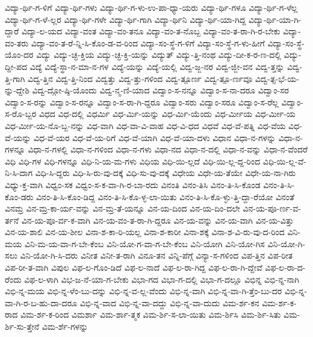 {ವಿದ್ಯಾ-ರ್ಥಿ-ಗ-ಳಿಗೆ
ವಿದ್ಯಾ-ರ್ಥಿ-ಗಳು
ವಿದ್ಯಾ-ರ್ಥಿ-ಗ-ಳು-ಉ-ಪಾ-ಧ್ಯಾ-ಯರು
ವಿದ್ಯಾ-ರ್ಥಿ-ಗಳೂ
ವಿದ್ಯಾ-ರ್ಥಿ-ಗ-ಳೆಲ್ಲ
ವಿದ್ಯಾ-ರ್ಥಿ-ಗ-ಳೆ-ಲ್ಲರ
ವಿದ್ಯಾ-ರ್ಥಿ-ಗಳೇ
ವಿದ್ಯಾ-ರ್ಥಿ-ಗಾಗಿ
ವಿದ್ಯಾ-ರ್ಥಿನಿ
ವಿದ್ಯಾ-ರ್ಥಿ-ಯಾ-ಗಿದ್ದ
ವಿದ್ಯಾ-ರ್ಥಿ-ಯಾ-ಗಿ-ದ್ದಾರೆ
ವಿದ್ಯಾ-ಲ-ಯದ
ವಿದ್ಯಾ-ವಂತ
ವಿದ್ಯಾ-ವಂ-ತನೂ
ವಿದ್ಯಾ-ವಂ-ತ-ನೊಬ್ಬ
ವಿದ್ಯಾ-ವಂ-ತ-ರಾ-ಗಿ-ರ-ಬೇಕು
ವಿದ್ಯಾ-ವಂ-ತರು
ವಿದ್ಯಾ-ವಂ-ತ-ರೆ-ನ್ನಿ-ಸಿ-ಕೊಂ-ಡ-ವ-ರಿಂದ
ವಿದ್ಯಾ-ಸಂ-ಸ್ಥೆ-ಗ-ಳಿಗೆ
ವಿದ್ಯಾ-ಸಂ-ಸ್ಥೆ-ಗ-ಳು-ಹೀಗೆ
ವಿದ್ಯಾ-ಸಂ-ಸ್ಥೆ-ಯೊಂ-ದರ
ವಿದ್ಯು
ವಿದ್ಯು-ಚ್ಛ-ಕ್ತಿಯ
ವಿದ್ಯು-ಚ್ಛ-ಕ್ತಿ-ಯನ್ನು
ವಿದ್ಯುತ್
ವಿದ್ಯು-ತ್ತಿ-ನಂಥ
ವಿದ್ಯು-ದೀ-ಕ-ರ-ಣ-ದಲ್ಲಿ
ವಿದ್ಯು-ದ್ದೀ-ಪದ
ವಿದ್ಯೆ
ವಿದ್ಯೆ-ಸ್ಥಾ-ನ-ಮಾ-ನ-ಗಳ
ವಿದ್ಯೆ-ಯನ್ನು
ವಿದ್ಯೆ-ಯಲ್ಲಿ
ವಿದ್ವ-ಜ್ಜ-ನರ
ವಿದ್ವ-ಜ್ಜೀ-ವನ
ವಿದ್ವ-ತ್ತನ್ನು
ವಿದ್ವ-ತ್ತಿ-ಗಾಗಿ
ವಿದ್ವ-ತ್ತಿನ
ವಿದ್ವ-ತ್ತಿ-ನಿಂದ
ವಿದ್ವತ್ತು
ವಿದ್ವ-ತ್ತು-ಗಳಿಂದ
ವಿದ್ವ-ತ್ಪೂರ್ಣ
ವಿದ್ವ-ತ್ಪೂ-ರ್ಣವೂ
ವಿದ್ವ-ತ್ಸ-ಭೆ-ಯ-ನ್ನು-ದ್ದೇಶಿ
ವಿದ್ವ-ದ್ಗೋ-ಷ್ಠಿ-ಯೊಂದು
ವಿದ್ವ-ನ್ಮ-ಣಿ-ಯಾದ
ವಿದ್ವಾಂ-ಸ-ನನ್ನೂ
ವಿದ್ವಾಂ-ಸ-ನಾ-ದರೂ
ವಿದ್ವಾಂ-ಸರ
ವಿದ್ವಾಂ-ಸ-ರನ್ನು
ವಿದ್ವಾಂ-ಸ-ರನ್ನೂ
ವಿದ್ವಾಂ-ಸ-ರಾ-ಗಿ-ದ್ದರೂ
ವಿದ್ವಾಂ-ಸರು
ವಿದ್ವಾಂ-ಸರೂ
ವಿದ್ವಾಂ-ಸ-ರೆಲ್ಲ
ವಿದ್ವಾಂ-ಸ-ರೊ-ಬ್ಬರ
ವಿಧದ
ವಿಧ-ದಲ್ಲಿ
ವಿಧರ್ಮಿ
ವಿಧ-ರ್ಮಿ-ಯನ್ನು
ವಿಧ-ರ್ಮಿ-ಯೆಂದು
ವಿಧ-ರ್ಮೀಯ
ವಿಧ-ರ್ಮೀ-ಯ
ವಿಧ-ರ್ಮೀ-ಯ-ನೊ-ಬ್ಬ-ನನ್ನು
ವಿಧ-ವಾಗಿ
ವಿಧ-ವಾ-ವಿ-ವಾಹ
ವಿಧ-ವಿ-ಧದ
ವಿಧವೆ
ವಿಧ-ವೆ-ಪತ್ನಿ
ವಿಧ-ವೆಯ
ವಿಧ-ವೆ-ಯನ್ನು
ವಿಧ-ವೆ-ಯರ
ವಿಧ-ವೆ-ಯ-ರಿಗೆ
ವಿಧ-ವೆ-ಯಾಗಿ
ವಿಧ-ವೆ-ಯಾ-ದಳು
ವಿಧಾನ
ವಿಧಾ-ನ-ಗಳನ್ನು
ವಿಧಾ-ನ-ಗಳನ್ನೂ
ವಿಧಾ-ನ-ಗಳಲ್ಲಿ
ವಿಧಾ-ನ-ಗಳಿಂದ
ವಿಧಾ-ನ-ಗಳು
ವಿಧಾ-ನದ
ವಿಧಾ-ನ-ದಲ್ಲಿ
ವಿಧಾ-ನ-ವನ್ನು
ವಿಧಾ-ನ-ವೆಂದರೆ
ವಿಧಿ
ವಿಧಿ-ಗಳ
ವಿಧಿ-ಗಳನ್ನೂ
ವಿಧಿ-ನಿ-ಯ-ಮ-ಗಳು
ವಿಧಿಯ
ವಿಧಿ-ಯಿ-ಲ್ಲದೆ
ವಿಧಿ-ಯಿ-ಲ್ಲ-ದ್ದ-ರಿಂದ
ವಿಧಿ-ಯಿ-ಲ್ಲ-ವೆ-ನಿ-ಸಿ-ದಾಗ
ವಿಧಿ-ಸಿ-ದ್ದರು
ವಿಧಿ-ಸಿ-ರು-ವು-ದಕ್ಕೆ
ವಿಧಿ-ಸು-ವು-ದಕ್ಕೆ
ವಿಧೇಯ
ವಿಧೇ-ಯ-ತೆಯೇ
ವಿಧೇ-ಯ-ನಾ-ಗಿರು
ವಿಧ್ಯು-ಕ್ತ-ವಾಗಿ
ವಿಧ್ವಂ-ಸಕ
ವಿಧ್ವಂ-ಸ-ಕ-ವಾ-ಗಿ-ರ-ಬಾ-ರದು
ವಿನಂತಿ
ವಿನಂ-ತಿಸಿ
ವಿನಂ-ತಿ-ಸಿ-ಕೊಂಡ
ವಿನಂ-ತಿ-ಸಿ-ಕೊಂ-ಡರು
ವಿನಂ-ತಿ-ಸಿ-ಕೊಂ-ಡಿದ್ದ
ವಿನಂ-ತಿ-ಸಿ-ಕೊ-ಳ್ಳ-ಲಾ-ಯಿತು
ವಿನಂ-ತಿ-ಸಿ-ಕೊ-ಳ್ಳು-ತ್ತಿ-ದ್ದಾ-ರೆಯೋ
ವಿನಂತೆ
ವಿನಮ್ರ
ವಿನ-ಮ್ರ-ಕಾ-ರ್ಯ-ವನ್ನು
ವಿನ-ಮ್ರ-ತೆ-ಯನ್ನೂ
ವಿನ-ಯ-ದಿಂದ
ವಿನ-ಯ-ದಿಂ-ದಲೇ
ವಿನ-ಯ-ಪೂ-ರ್ಣ-ವ-ರ್ತನೆ
ವಿನ-ಯ-ಪೂ-ರ್ವ-ಕ-ವಾಗಿ
ವಿನ-ಯ-ವಂ-ತ-ರಾ-ಗಿ-ದ್ದರೂ
ವಿನ-ಯ-ವನ್ನು
ವಿನ-ಯ-ವಾಗಿ
ವಿನ-ಯ-ವಿತ್ತು
ವಿನ-ಯ-ಶಾಲಿ
ವಿನ-ಯ-ಶೀಲ
ವಿನಾ-ಶ-ಕಾ-ರಿ-ಯಲ್ಲ
ವಿನಾ-ಶ-ಕಾರೀ
ವಿನಾ-ಶಕ್ಕೆ
ವಿನಾ-ಶ-ವಿ-ರು-ವು-ದ-ರಿಂದ
ವಿನಿ-ಮಯ
ವಿನಿ-ಮ-ಯ-ವಾ-ಗ-ಬೇ-ಕೆಂಬ
ವಿನಿ-ಯೋ-ಗ-ವಾ-ಗ-ಬೇ-ಕೆಂಬ
ವಿನಿ-ಯೋಗಿ
ವಿನಿ-ಯೋ-ಗಿಸ
ವಿನಿ-ಯೋ-ಗಿ-ಸಲು
ವಿನಿ-ಯೋ-ಗಿ-ಸಿ-ದರು
ವಿನೀತ
ವಿನೀ-ತ-ರಾಗಿ
ವಿನೂ-ತನ
ವಿನ್ನಿ-ಪೆಗ್ಗೆ
ವಿನ್ಯಾ-ಸ-ಗಳಿಂದ
ವಿಪ-ತ್ತಿನ
ವಿಪ-ರೀತ
ವಿಪ-ರೀ-ತ-ವಾಗಿ
ವಿಪುಲ
ವಿಫ-ಲ-ಗೊಂ-ಡಿದೆ
ವಿಫ-ಲ-ನಾದೆ
ವಿಫ-ಲ-ರಾ-ಗಿದ್ದ
ವಿಫ-ಲ-ರಾ-ಗಿ-ದ್ದೇವೆ
ವಿಫ-ಲ-ರಾ-ದ-ರೆಂದು
ವಿಫ-ಲ-ಳಾಗಿ
ವಿಭ-ಜ-ನೆ-ಯಾ-ಗ-ಬೇಕು
ವಿಭಾ-ಗದ
ವಿಭಾ-ಗ-ದಲ್ಲಿ
ವಿಭಾ-ಗ-ದಲ್ಲೂ
ವಿಭಿನ್ನ
ವಿಭಿ-ನ್ನ-ನಾಗಿ
ವಿಭಿ-ನ್ನ-ಮಯ
ವಿಭಿ-ನ್ನ-ಳೆಂ-ಬು-ದನ್ನು
ವಿಭಿ-ನ್ನ-ವ-ಲ್ಲ-ವೆಂದು
ವಿಭಿ-ನ್ನ-ವಾಗಿ
ವಿಭಿ-ನ್ನ-ವಾ-ಗಿ-ತ್ತೆಂ-ಬು-ದರ
ವಿಭಿ-ನ್ನ-ವಾ-ಗಿ-ರ-ಬ-ಹು-ದಾ-ದರೂ
ವಿಭಿ-ನ್ನ-ವಾದ
ವಿಭಿ-ನ್ನ-ವಾ-ದದ್ದು
ವಿಭಿ-ನ್ನ-ವಾ-ದುದು
ವಿಮ-ರ್ಶ-ಕನ
ವಿಮ-ರ್ಶ-ಕ-ರಾದ
ವಿಮ-ರ್ಶ-ಕ-ರಿಂದ
ವಿಮರ್ಶಾ
ವಿಮ-ರ್ಶಾ-ತ್ಮಕ
ವಿಮ-ರ್ಶಿ-ಸ-ಲಾ-ಯಿತು
ವಿಮ-ರ್ಶಿಸಿ
ವಿಮ-ರ್ಶಿ-ಸಿತು
ವಿಮ-ರ್ಶಿ-ಸು-ತ್ತೇನೆ
ವಿಮ-ರ್ಶೆ-ಗಳನ್ನು
}
